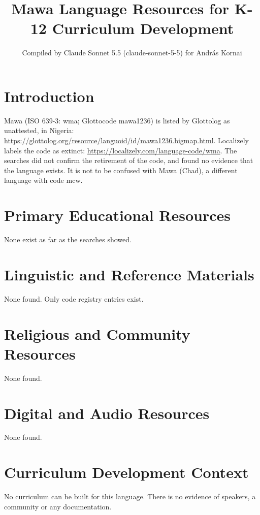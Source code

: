 \documentclass[12pt]{article}
\title{Mawa Language Resources for K-12 Curriculum Development}
\author{Compiled by Claude Sonnet 5.5 (claude-sonnet-5-5) for Andr\'as Kornai}
\date{}
\begin{document}
\maketitle

\section{Introduction}
Mawa (ISO 639-3: wma; Glottocode mawa1236) is listed by Glottolog as unattested, in Nigeria: \url{https://glottolog.org/resource/languoid/id/mawa1236.bigmap.html}. Localizely labels the code as extinct: \url{https://localizely.com/language-code/wma}. The searches did not confirm the retirement of the code, and found no evidence that the language exists. It is not to be confused with Mawa (Chad), a different language with code mcw.

\section{Primary Educational Resources}
None exist as far as the searches showed.

\section{Linguistic and Reference Materials}
None found. Only code registry entries exist.

\section{Religious and Community Resources}
None found.

\section{Digital and Audio Resources}
None found.

\section{Curriculum Development Context}
No curriculum can be built for this language. There is no evidence of speakers, a community or any documentation.
\end{document}
